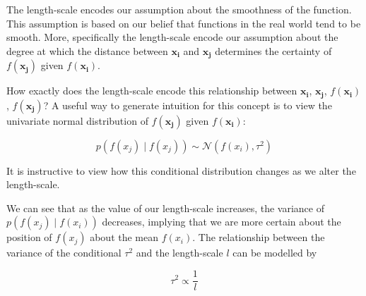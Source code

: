 \documentclass[10pt, a4paper, twocolumn]{article} %
\begin{document}
\begin{enumerate}
  The length-scale encodes our assumption about the smoothness of the function. This assumption is based on our belief that functions in the real world tend to be smooth. More, specifically the length-scale encode our assumption about the degree at which the distance between $\mathbf{x_i}$ and $\mathbf{x_j}$ determines the certainty of $f(\mathbf{x_j})$ given $f(\mathbf{x_i})$.
   
  How exactly does the length-scale encode this relationship between $\mathbf{x_i}$, $\mathbf{x_j}$, $f(\mathbf{x_i})$, $f(\mathbf{x_j})$? A useful way to generate intuition for this concept is to view the univariate normal distribution of $f(\mathbf{x_j})$ given $f(\mathbf{x_i})$:
   
\begin{equation}
    p(f(x_j)\mid f(x_j))\sim \mathcal{N}(f(x_i), \tau^{2})
\end{equation}

   It is instructive to view how this conditional distribution changes as we alter the length-scale. 
   
   
   We can see that as the value of our length-scale increases, the variance of $p(f(x_j)\mid f(x_i))$ decreases, implying that we are more certain about the position of $f(x_j)$ about the mean $f(x_i)$. The relationship between the variance of the conditional $\tau^2$ and the length-scale $l$ can be modelled by
   
   \begin{equation}
       \tau^2 \propto \frac{1}{l}
   \end{equation}
   

\end{enumerate}
\end{document}
